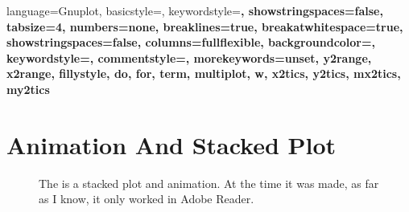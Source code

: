 \documentclass[10pt,a4paper,final]{report}
\begin{document}
\lstset
{
language=Gnuplot,
basicstyle=\ttfamily\scriptsize,
keywordstyle=\bfseries,
showstringspaces=false,
tabsize=4,
numbers=none,
breaklines=true,
breakatwhitespace=true,
showstringspaces=false,
columns=fullflexible, %
backgroundcolor=\color{gray!10},
keywordstyle=\color{CodeRed},
commentstyle=\color{CodeGreen},
morekeywords={unset, y2range, x2range, fillystyle, do, for, term, multiplot, w, x2tics, y2tics, mx2tics, my2tics}
}



\tableofcontents

\section{Animation And Stacked Plot}
\begin{figure}[htbp]
    \centering
    \caption{The is a stacked plot and animation.  At the time it was made, as far as I know, it only worked in Adobe Reader.}
\end{figure}

\end{document}
